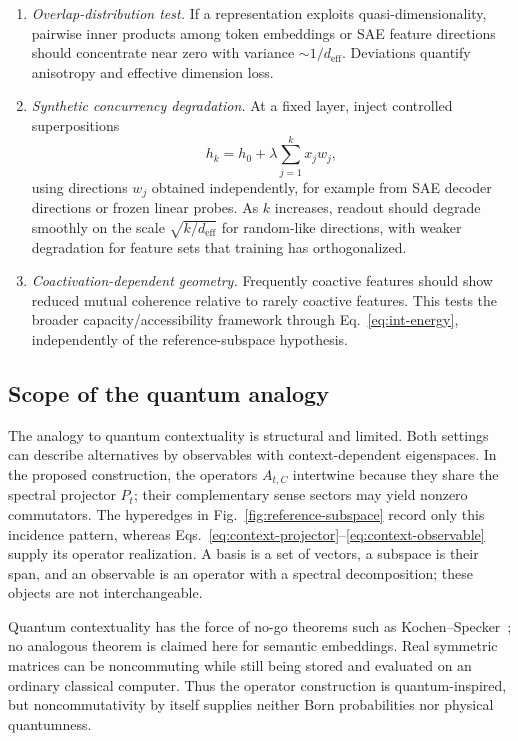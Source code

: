 \documentclass[
  aps,
  reprint,
  superscriptaddress,
  floatfix,
  nofootinbib,
  longbibliography
]{revtex4-2}
\newcommand{\deff}{d_{\mathrm{eff}}}
\begin{document}
\begin{enumerate}
\item \emph{Overlap-distribution test.}
If a representation exploits quasi-dimensionality, pairwise inner
products among token embeddings or SAE feature directions should
concentrate near zero with variance $\sim1/\deff$. Deviations quantify
anisotropy and effective dimension loss.

\item \emph{Synthetic concurrency degradation.}
At a fixed layer, inject controlled superpositions
%
\begin{equation}
h_k=h_0+\lambda\sum_{j=1}^k x_j w_j,
\end{equation}
%
using directions $w_j$ obtained independently, for example from SAE
decoder directions or frozen linear probes. As $k$ increases, readout
should degrade smoothly on the scale $\sqrt{k/\deff}$ for random-like
directions, with weaker degradation for feature sets that training has
orthogonalized.

\item \emph{Coactivation-dependent geometry.}
Frequently coactive features should show reduced mutual coherence
relative to rarely coactive features. This tests the broader
capacity/accessibility framework through Eq.~\eqref{eq:int-energy},
independently of the reference-subspace hypothesis.
\end{enumerate}

\subsection{Scope of the quantum analogy}
\label{sec:quantum}

The analogy to quantum contextuality is structural and limited. Both settings
can describe alternatives by observables with context-dependent eigenspaces.
In the proposed construction, the operators $A_{t,C}$ intertwine because they
share the spectral projector $P_t$; their complementary sense sectors may
yield nonzero commutators.  The hyperedges in
Fig.~\ref{fig:reference-subspace} record only this incidence pattern, whereas
Eqs.~\eqref{eq:context-projector}--\eqref{eq:context-observable} supply its
operator realization.  A basis is a set of vectors, a subspace is their span,
and an observable is an operator with a spectral decomposition; these objects
are not interchangeable.

Quantum contextuality has the force of no-go theorems such as
Kochen--Specker~\cite{specker-60,kochen1}; no analogous theorem is claimed
here for semantic embeddings.  Real symmetric matrices can be noncommuting
while still being stored and evaluated on an ordinary classical computer.
Thus the operator construction is quantum-inspired, but noncommutativity by
itself supplies neither Born probabilities nor physical quantumness.
\end{document}
